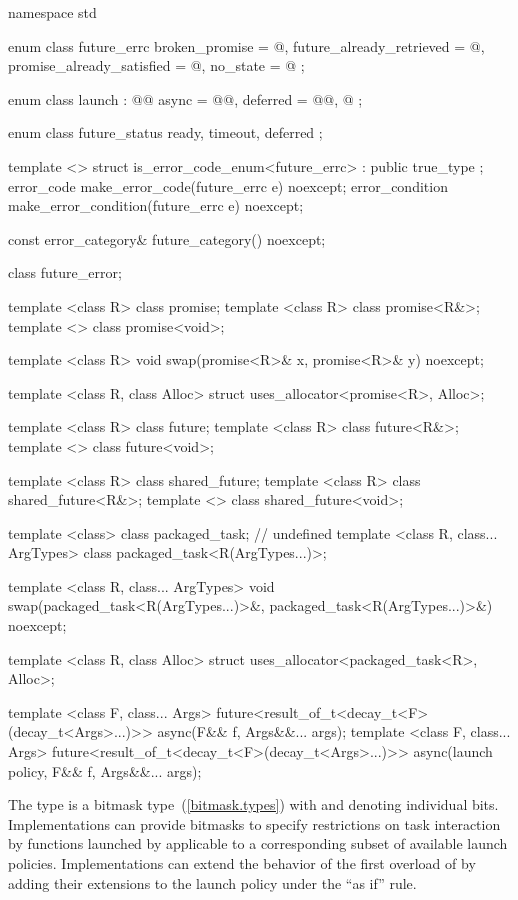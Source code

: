 
\begin{codeblock}
namespace std {
  enum class future_errc {
    broken_promise = @\impdef@,
    future_already_retrieved = @\impdef@,
    promise_already_satisfied = @\impdef@,
    no_state = @\impdef@
  };

  enum class launch : @\unspec{}@ {
    async = @\unspec{}@,
    deferred = @\unspec{}@,
    @\impdef@
  };

  enum class future_status {
    ready,
    timeout,
    deferred
  };

  template <> struct is_error_code_enum<future_errc> : public true_type { };
  error_code make_error_code(future_errc e) noexcept;
  error_condition make_error_condition(future_errc e) noexcept;

  const error_category& future_category() noexcept;

  class future_error;

  template <class R> class promise;
  template <class R> class promise<R&>;
  template <> class promise<void>;

  template <class R>
    void swap(promise<R>& x, promise<R>& y) noexcept;

  template <class R, class Alloc>
    struct uses_allocator<promise<R>, Alloc>;

  template <class R> class future;
  template <class R> class future<R&>;
  template <> class future<void>;

  template <class R> class shared_future;
  template <class R> class shared_future<R&>;
  template <> class shared_future<void>;

  template <class> class packaged_task;   // undefined
  template <class R, class... ArgTypes>
    class packaged_task<R(ArgTypes...)>;

  template <class R, class... ArgTypes>
    void swap(packaged_task<R(ArgTypes...)>&, packaged_task<R(ArgTypes...)>&) noexcept;

  template <class R, class Alloc>
    struct uses_allocator<packaged_task<R>, Alloc>;

  template <class F, class... Args>
    future<result_of_t<decay_t<F>(decay_t<Args>...)>>
    async(F&& f, Args&&... args);
  template <class F, class... Args>
    future<result_of_t<decay_t<F>(decay_t<Args>...)>>
    async(launch policy, F&& f, Args&&... args);
}
\end{codeblock}

\pnum
The  type  is a bitmask type~(\ref{bitmask.types}) with
 and  denoting individual bits.
\enternote Implementations can provide bitmasks to specify restrictions on task
interaction by functions launched by  applicable to a
corresponding subset of available launch policies. Implementations can extend
the behavior of the first overload of  by adding their extensions
to the launch policy under the ``as if'' rule. \exitnote

